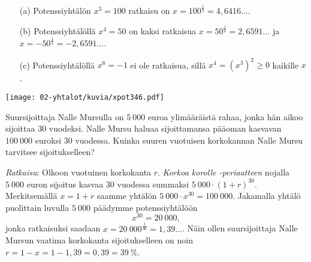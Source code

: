 \begin{esimerkki}
\begin{enumerate}
\item[(a)]
Potenssiyhtälön $x^3 = 100$ ratkaisu on $x=100^{\frac{1}{3}}=4{,}6416...$.
\item[(b)]
Potenssiyhtälöllä $x^4=50$ on kaksi ratkaisua $x=50^{\frac{1}{4}}=2{,}6591...$ ja $x=-50^{\frac{1}{4}}=-2{,}6591...$.
\item[(c)] 
Potenssiyhtälöllä $x^6 = -1$ ei ole ratkaisua, sillä $x^4 = (x^3)^2 \ge 0$ kaikille $x$.
\end{enumerate}

\begin{center}
\texttt{[image: 02-yhtalot/kuvia/xpot346.pdf]}
\end{center}
\end{esimerkki}


\begin{esimerkki}
Suursijoittaja Nalle Mursulla on $5~000$ euroa ylimääräistä rahaa, jonka hän aikoo sijoittaa $30$ vuodeksi.  Nalle Mursu haluaa sijoittamansa pääoman kasvavan $100~000$ euroksi $30$ vuodessa.  Kuinka suuren vuotuisen korkokannan Nalle Mursu tarvitsee sijoitukselleen?

\emph{Ratkaisu}:  Olkoon vuotuinen korkokanta $r$. \emph{Korkoa korolle -periaatteen} nojalla $5~000$ euron sijoitus kasvaa $30$ vuodessa summaksi $5~000\cdot(1+r)^{30}$.  Merkitsemällä $x=1+r$ saamme yhtälön $5~000\cdot x^{30} = 100~000$.  Jakamalla yhtälö puolittain luvulla $5~000$ päädymme
potenssiyhtälöön 
$$
x^{30} = 20~000,
$$ 
jonka ratkaisuksi saadaan $x=20~000^{\frac{1}{30}} = 1{,}39...$. Näin
ollen suursijoittaja Nalle Mursun vaatima korkokanta sijoitukselleen on noin $r=1-x=1-1,39=0,39=39~\%$.
\end{esimerkki}






